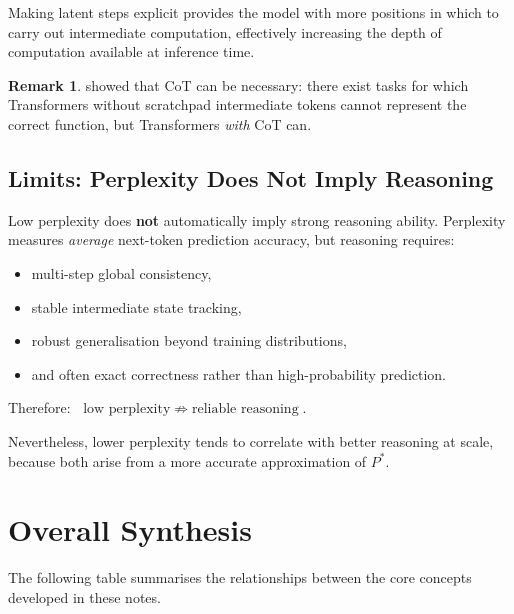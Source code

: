 \documentclass[11pt,a4paper]{article}
\theoremstyle{definition}
\newtheorem{remark}{Remark}[section]
\theoremstyle{plain}
\begin{document}
Making latent steps explicit provides the model with more positions in which
to carry out intermediate computation, effectively increasing the depth of
computation available at inference time.

\begin{remark}
  \citet{feng2023towards} showed that CoT can be necessary: there exist tasks
  for which Transformers without scratchpad intermediate tokens cannot represent
  the correct function, but Transformers \emph{with} CoT can.
\end{remark}

\subsection{Limits: Perplexity Does Not Imply Reasoning}

\begin{cautionbox}
Low perplexity does \textbf{not} automatically imply strong reasoning ability.
Perplexity measures \emph{average} next-token prediction accuracy, but
reasoning requires:
\begin{itemize}[leftmargin=1.5em, itemsep=1pt]
  \item multi-step global consistency,
  \item stable intermediate state tracking,
  \item robust generalisation beyond training distributions,
  \item and often exact correctness rather than high-probability prediction.
\end{itemize}
Therefore: $\;\text{low perplexity} \;\not\Rightarrow\; \text{reliable reasoning}$.

Nevertheless, lower perplexity tends to correlate with better reasoning at scale,
because both arise from a more accurate approximation of $P^*$.
\end{cautionbox}

\section{Overall Synthesis}

The following table summarises the relationships between the core concepts
developed in these notes.
\end{document}
